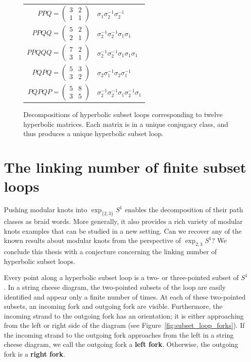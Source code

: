 \documentclass[12pt,twoside]{reedthesis}
\theoremstyle{definition}
\newcommand{\exptwothree}{\exp_{\{2,3\}}}
\newcommand{\defnphrase}[1]{\textbf{#1}}
\begin{document}
\begin{figure}[p]
\begin{tabular}{r l}
   $PPQ = \begin{pmatrix}3 & 2 \\ 1 & 1\end{pmatrix}$ & $\sigma_1 \sigma_2^{-1} \sigma_2^{-1}$ \\[1em]
   $PPQQ = \begin{pmatrix}5 & 2 \\ 2 & 1\end{pmatrix}$ & $\sigma_2^{-1} \sigma_2^{-1} \sigma_1 \sigma_1$ \\[1em]
   $PPQQQ = \begin{pmatrix}7 & 2 \\ 3 & 1\end{pmatrix}$ & $\sigma_2^{-1} \sigma_2^{-1} \sigma_1 \sigma_1 \sigma_1$ \\[1em]
   $PQPQ = \begin{pmatrix}5 & 3 \\ 3 & 2\end{pmatrix}$ & $\sigma_2 \sigma_1^{-1} \sigma_2 \sigma_1^{-1}$ \\[1em]
   $PQPQP = \begin{pmatrix}5 & 8 \\ 3 & 5\end{pmatrix}$ & $\sigma_2^{-1} \sigma_2^{-1} \sigma_1 \sigma_2^{-1} \sigma_1$
  \end{tabular}
  \caption{Decompositions of hyperbolic subset loops corresponding to twelve hyperbolic matrices. Each matrix is in a unique conjugacy class, and thus produces a unique hyperbolic subset loop.}
  \label{fig:subset_loop_decompositions_table}
\end{figure}

\section{The linking number of finite subset loops}

Pushing modular knots into $\exptwothree S^1$ enables the decomposition of their path classes as braid words.
More generally, it also provides a rich variety of modular knots examples that can be studied in a new setting.
Can we recover any of the known results about modular knots from the perspective of $\exp_{2,3} S^1$?
We conclude this thesis with a conjecture concerning the linking number of hyperbolic subset loops.

Every point along a hyperbolic subset loop is a two- or three-pointed subset of $S^1$.
In a string cheese diagram, the two-pointed subsets of the loop are easily identified and appear only a finite number of times.
At each of these two-pointed subsets, an incoming fork and outgoing fork are visible.
Furthermore, the incoming strand to the outgoing fork has an orientation; it is either approaching from the left or right side of the diagram (see Figure~\ref{fig:subset_loop_forks}). 
If the incoming strand to the outgoing fork approaches from the left in a string cheese diagram, we call the outgoing fork a \defnphrase{left fork}.
Otherwise, the outgoing fork is a \defnphrase{right fork}.
\end{document}
